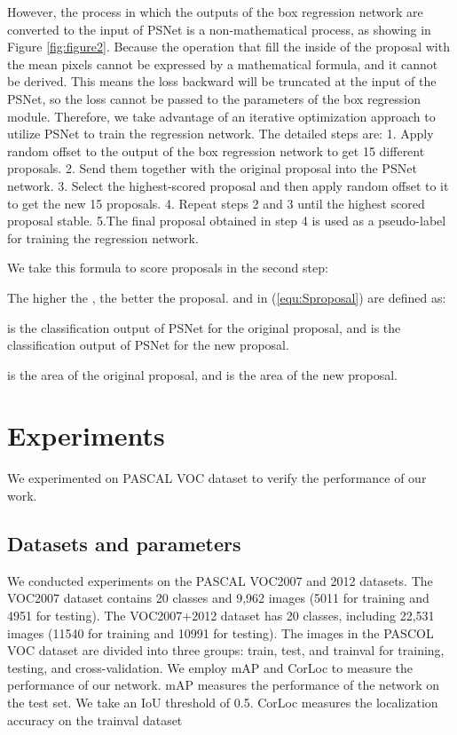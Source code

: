 \documentclass[final,3p,times,twocolumn]{elsarticle}
\begin{document}
However, the process in which the outputs of the box regression network are converted to the input of PSNet is a non-mathematical process, as showing in Figure \ref{fig:figure2}. Because the operation that fill the inside of the proposal with the mean pixels cannot be expressed by a mathematical formula, and it cannot be derived. This means the loss backward will be truncated at the input of the PSNet, so the loss cannot be passed to the parameters of the box regression module. Therefore, we take advantage of an iterative optimization approach to utilize PSNet to train the regression network. The detailed steps are: 1. Apply random offset to the output of the box regression network to get 15 different proposals. 2. Send them together with the original proposal into the PSNet network. 3. Select the highest-scored proposal and then apply random offset to it to get the new 15 proposals. 4. Repeat steps 2 and 3 until the highest scored proposal stable. 5.The final proposal obtained in step 4 is used as a pseudo-label for training the regression network.

We take this formula to score proposals in the second step:


The higher the , the better the proposal.  and  in (\ref{equ:Sproposal}) are defined as:



 is the classification output of PSNet for the original proposal, and  is the classification output of PSNet for the new proposal.



 is the area of the original proposal, and  is the area of the new proposal.

\section{Experiments}
We experimented on PASCAL VOC dataset to verify the performance of our work.

\subsection{Datasets and parameters}
We conducted experiments on the PASCAL VOC2007 and 2012 datasets. The VOC2007 dataset contains 20 classes and 9,962 images (5011 for training and 4951 for testing). The VOC2007+2012 dataset has 20 classes, including 22,531 images (11540 for training and 10991 for testing). The images in the PASCOL VOC dataset are divided into three groups: train, test, and trainval for training, testing, and cross-validation. We employ mAP and CorLoc to measure the performance of our network. mAP measures the performance of the network on the test set. We take an IoU threshold of 0.5. CorLoc measures the localization accuracy on the trainval dataset
\end{document}
